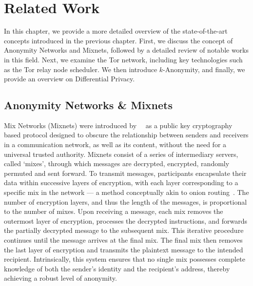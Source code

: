 
%

\chapter{Related Work}\label{cha:related_work}

In this chapter, we provide a more detailed overview of the state-of-the-art concepts introduced in the previous chapter. First, we discuss the concept of Anonymity Networks and Mixnets, followed by a detailed review of notable works in this field. Next, we examine the Tor network, including key technologies such as the Tor relay node scheduler. We then introduce \(k\)-Anonymity, and finally, we provide an overview on Differential Privacy.

\section{Anonymity Networks \& Mixnets}\label{sec:anonymity_networks_mixnets}

Mix Networks (Mixnets) were introduced by~\citeauthor{Chaum2003}~\cite{Chaum2003} as a public key cryptography based protocol designed to obscure the relationship between senders and receivers in a communication network, as well as its content, without the need for a universal trusted authority. Mixnets consist of a series of intermediary servers, called `mixes', through which messages are decrypted, encrypted, randomly permuted and sent forward.
To transmit messages, participants encapsulate their data within successive layers of encryption, with each layer corresponding to a specific mix in the network — a method conceptually akin to onion routing~\cite{OnionRouting}. The number of encryption layers, and thus the length of the messages, is proportional to the number of mixes. Upon receiving a message, each mix removes the outermost layer of encryption, processes the decrypted instructions, and forwards the partially decrypted message to the subsequent mix. This iterative procedure continues until the message arrives at the final mix. The final mix then removes the last layer of encryption and transmits the plaintext message to the intended recipient. Intrinsically, this system ensures that no single mix possesses complete knowledge of both the sender's identity and the recipient's address, thereby achieving a robust level of anonymity.

